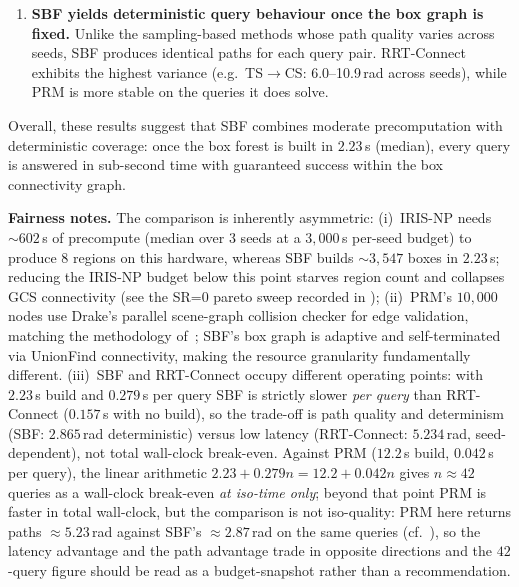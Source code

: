 \documentclass[journal]{IEEEtran}
\begin{document}
\begin{enumerate}
  \item \textbf{SBF yields deterministic query behaviour once the box
    graph is fixed.}
    Unlike the sampling-based methods whose path quality
    varies across seeds, SBF produces identical paths
    for each query pair.
    RRT-Connect exhibits the highest variance
    (e.g.\ TS$\to$CS: 6.0--10.9\,rad across seeds),
    while PRM is more stable on the queries it does solve.
\end{enumerate}

Overall, these results suggest that SBF combines moderate
precomputation with deterministic coverage:
once the box forest is built in $2.23$\,s (median), every query is answered
in sub-second time with guaranteed success within the
box connectivity graph.

\textbf{Fairness notes.}
The comparison is inherently asymmetric:
(i)~IRIS-NP needs ${\sim}602$\,s of precompute (median over 3 seeds
    at a $3{,}000$\,s per-seed budget) to produce $8$ regions on
    this hardware, whereas SBF builds ${\sim}3{,}547$ boxes in
    $2.23$\,s; reducing the IRIS-NP budget below this point starves
    region count and collapses GCS connectivity (see the SR=$0$
    pareto sweep recorded in );
(ii)~PRM's $10{,}000$ nodes use Drake's parallel scene-graph
    collision checker for edge validation,
    matching the methodology of~\cite{marcucci2024motion};
    SBF's box graph is adaptive and self-terminated via UnionFind
    connectivity, making the resource granularity fundamentally different.
(iii)~SBF and RRT-Connect occupy different operating points: with
    $2.23$\,s build and $0.279$\,s per query SBF is strictly slower
    \emph{per query} than RRT-Connect ($0.157$\,s with no build),
    so the trade-off is path quality and determinism (SBF: $2.865$\,rad
    deterministic) versus low latency (RRT-Connect: $5.234$\,rad,
    seed-dependent), not total wall-clock break-even. Against PRM
    ($12.2$\,s build, $0.042$\,s per query), the linear arithmetic
    $2.23 + 0.279n = 12.2 + 0.042n$ gives $n\!\approx\!42$ queries as
    a wall-clock break-even \emph{at iso-time only}; beyond that point
    PRM is faster in total wall-clock, but the comparison is not
    iso-quality: PRM here returns paths $\approx 5.23$\,rad against
    SBF's $\approx 2.87$\,rad on the same queries (cf.\
    ), so the latency advantage and the path
    advantage trade in opposite directions and the $42$-query figure
    should be read as a budget-snapshot rather than a recommendation.
\end{document}
